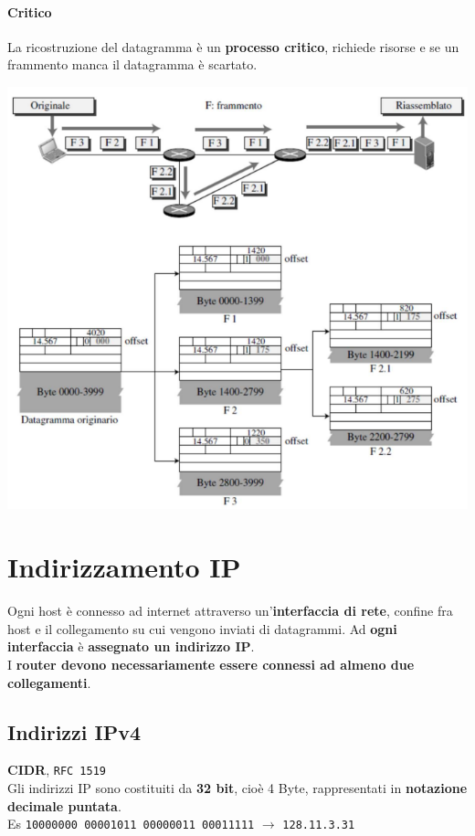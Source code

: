 \documentclass[10pt]{article}
\begin{document}
\paragraph{Critico} La ricostruzione del datagramma è un \textbf{processo critico}, richiede risorse e se un frammento manca il datagramma è scartato.
\begin{center}
\includegraphics[scale=0.8]{ipframmentazioneesempio.png}
\end{center}
\pagebreak
\section{Indirizzamento IP}
Ogni host è connesso ad internet attraverso un'\textbf{interfaccia di rete}, confine fra host e il collegamento su cui vengono inviati di datagrammi. Ad \textbf{ogni interfaccia} è \textbf{assegnato un indirizzo IP}.\\
I \textbf{router devono necessariamente essere connessi ad almeno due collegamenti}.
\subsection{Indirizzi IPv4}
\textbf{CIDR}, \texttt{RFC 1519}\\
Gli indirizzi IP sono costituiti da \textbf{32 bit}, cioè 4 Byte, rappresentati in \textbf{notazione decimale puntata}.\\
Es \texttt{10000000  00001011  00000011  00011111} $\longrightarrow$ \texttt{128.11.3.31}
\end{document}
